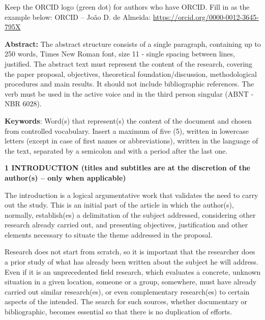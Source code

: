 \documentclass[revista,english,oneside]{ifes8}
\begin{document}
\noindent\textbullet\quad Keep the ORCID logo (green dot) for authors who have ORCID.
Fill in as the example below: ORCID -- João D. de Almeida:
\url{https://orcid.org/0000-0012-3645-795X}

\begin{resumoabstract}

\noindent\textbf{Abstract:} The abstract structure consists of a single paragraph,
containing up to 250 words, Times New Roman font, size 11 - single spacing between
lines, justified. The abstract text must represent the content of the research, covering
the paper proposal, objectives, theoretical foundation/discussion, methodological
procedures and main results. It should not include bibliographic references. The verb
must be used in the active voice and in the third person singular (ABNT - NBR 6028).

\vspace{2mm}
\noindent\textbf{Keywords}: Word(s) that represent(s) the content of the document and
chosen from controlled vocabulary. Insert a maximum of five (5), written in lowercase
letters (except in case of first names or abbreviations), written in the language of the
text, separated by a semicolon and with a period after the last one.

\end{resumoabstract}

\twocolumn
\noindent\textbf{1 INTRODUCTION (titles and subtitles are at the discretion of the
author(s) -- only when applicable)}

The introduction is a logical argumentative work that validates the need to carry out
the study. This is an initial part of the article in which the author(s), normally,
establish(es) a delimitation of the subject addressed, considering other research
already carried out, and presenting objectives, justification and other elements
necessary to situate the theme addressed in the proposal.

Research does not start from scratch, so it is important that the researcher does a
prior study of what has already been written about the subject he will address. Even if
it is an unprecedented field research, which evaluates a concrete, unknown situation in
a given location, someone or a group, somewhere, must have already carried out similar
research(es), or even complementary research(es) to certain aspects of the intended. The
search for such sources, whether documentary or bibliographic, becomes essential so that
there is no duplication of efforts.
\end{document}
